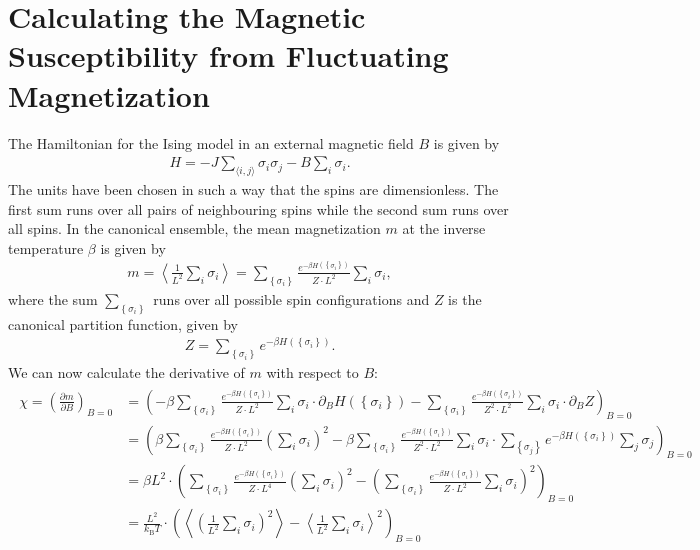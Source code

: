\documentclass[a4paper,10pt,bibtotoc]{scrartcl}
\begin{document}
\section{Calculating the Magnetic Susceptibility from Fluctuating Magnetization}
The Hamiltonian for the Ising model in an external magnetic field $B$ is given by
\begin{align}
H = -J\sum_{\langle i, j\rangle} \sigma_i\sigma_j - B\sum_{i} \sigma_i.
\end{align}
The units have been chosen in such a way that the spins are dimensionless. The first sum runs over all pairs of neighbouring spins while the second sum runs over all spins. In the canonical ensemble, the mean magnetization $m$ at the inverse temperature $\beta$ is given by
\begin{align}
m = \left\langle\frac{1}{L^2}\sum_{i}\sigma_i\right\rangle = \sum_{\left\{\sigma_i\right\}}\frac{e^{-\beta H\left(\left\{\sigma_i\right\}\right)}}{Z\cdot L^2}\sum_{i}\sigma_i,
\end{align}
where the sum $\sum_{\left\{\sigma_i\right\}}$ runs over all possible spin configurations and $Z$ is the canonical partition function, given by
\begin{align}
Z = \sum_{\left\{\sigma_i\right\}}e^{-\beta H\left(\left\{\sigma_i\right\}\right)}.
\end{align}
We can now calculate the derivative of $m$ with respect to $B$:
\begin{align}
\begin{split}
\chi = \left(\frac{\partial m}{\partial B}\right)_{B=0} &= \left(-\beta\sum_{\left\{\sigma_i\right\}}\frac{e^{-\beta H\left(\left\{\sigma_i\right\}\right)}}{Z\cdot L^2}\sum_{i}\sigma_i\cdot \partial_BH\left(\left\{\sigma_i\right\}\right)-\sum_{\left\{\sigma_i\right\}}\frac{e^{-\beta H\left(\left\{\sigma_i\right\}\right)}}{Z^2\cdot L^2}\sum_{i}\sigma_i\cdot \partial_BZ\right)_{B=0}\\
&= \left(\beta\sum_{\left\{\sigma_i\right\}}\frac{e^{-\beta H\left(\left\{\sigma_i\right\}\right)}}{Z\cdot L^2}\left(\sum_{i}\sigma_i\right)^2-\beta\sum_{\left\{\sigma_i\right\}}\frac{e^{-\beta H\left(\left\{\sigma_i\right\}\right)}}{Z^2\cdot L^2}\sum_{i}\sigma_i\cdot\sum_{\left\{\sigma_j\right\}}e^{-\beta H\left(\left\{\sigma_i\right\}\right)}\sum_{j}\sigma_j\right)_{B=0}\\
&= \beta L^2\cdot \left(\sum_{\left\{\sigma_i\right\}}\frac{e^{-\beta H\left(\left\{\sigma_i\right\}\right)}}{Z\cdot L^4}\left(\sum_{i}\sigma_i\right)^2-\left(\sum_{\left\{\sigma_i\right\}}\frac{e^{-\beta H\left(\left\{\sigma_i\right\}\right)}}{Z\cdot L^2}\sum_{i}\sigma_i\right)^2\right)_{B=0}\\
&= \frac{L^2}{k_\mathrm{B}T}\cdot\left(\left\langle\left(\frac{1}{L^2}\sum_{i}\sigma_i\right)^2\right\rangle-\left\langle\frac{1}{L^2}\sum_{i}\sigma_i\right\rangle^2\right)_{B=0}
\end{split}
\end{align}
\end{document}
